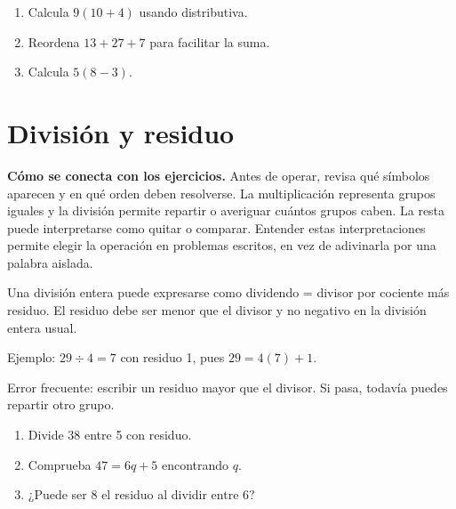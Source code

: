 \documentclass[10pt,oneside,openany]{book}
\begin{document}
\begin{practica}

\begin{enumerate}

\item Calcula $9(10+4)$ usando distributiva.

\item Reordena $13+27+7$ para facilitar la suma.

\item Calcula $5(8-3)$.

\end{enumerate}

\end{practica}



\section{División y residuo}

\textbf{Cómo se conecta con los ejercicios.} Antes de operar, revisa qué símbolos aparecen y en qué orden deben resolverse. La multiplicación representa grupos iguales y la división permite repartir o averiguar cuántos grupos caben. La resta puede interpretarse como quitar o comparar. Entender estas interpretaciones permite elegir la operación en problemas escritos, en vez de adivinarla por una palabra aislada.

Una división entera puede expresarse como dividendo = divisor por cociente más residuo. El residuo debe ser menor que el divisor y no negativo en la división entera usual.

\begin{ejemplo}
Ejemplo: $29\div4=7$ con residuo 1, pues $29=4(7)+1$.
\end{ejemplo}

\begin{ojo}
Error frecuente: escribir un residuo mayor que el divisor. Si pasa, todavía puedes repartir otro grupo.
\end{ojo}

\begin{practica}

\begin{enumerate}

\item Divide 38 entre 5 con residuo.

\item Comprueba $47=6q+5$ encontrando $q$.

\item ¿Puede ser 8 el residuo al dividir entre 6?

\end{enumerate}

\end{practica}
\end{document}
